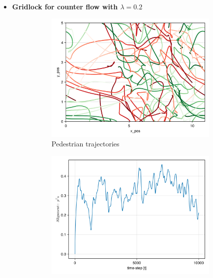 \begin{itemize}
    \item \textbf{Gridlock for counter flow with $\lambda = 0.2$}
    \begin{figure}[H]
        \centering
        \begin{subfigure}{0.49\textwidth}
            \centering
            \includegraphics[width=\linewidth]{figures/ch5_collective/counter_gridlockdflow_4000.png}
            \caption{Pedestrian trajectories}
            \label{plot:countergridlock_traj}
        \end{subfigure}
        \begin{subfigure}{.49\textwidth}
            \centering
            \includegraphics[width=\linewidth]{figures/ch5_collective/straight_gridlock_counter.png}

\end{subfigure}
\end{figure}
\end{itemize}
